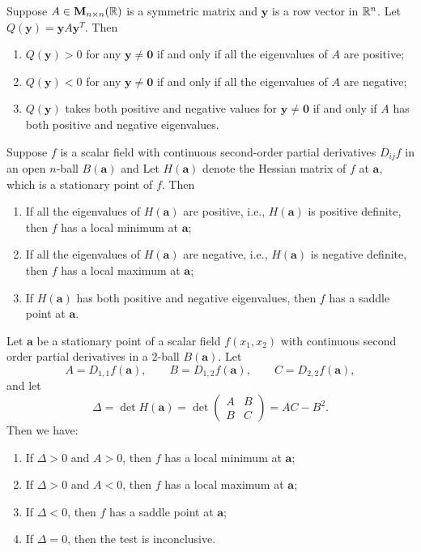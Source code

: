    \begin{lemmaenv}
        Suppose $A\in \mathbf M_{n\times n}(\mathbb{R})$ is a symmetric matrix and $\bm y $ is a row vector in $\mathbb{R}^n$. Let $Q(\bm y) = \bm y A \bm y^T$. Then
        \begin{enumerate}
            \item $Q(\bm y) > 0$ for any $\bm y \ne \bm 0$ if and only if all the eigenvalues of $A$ are positive;
            \item $Q(\bm y) < 0$ for any $\bm y \ne \bm 0$ if and only if all the eigenvalues of $A$ are negative;
            \item $Q(\bm y)$ takes both positive and negative values for $\bm y \ne \bm 0$ if and only if $A$ has both positive and negative eigenvalues.
        \end{enumerate}
    \end{lemmaenv}
    \begin{theoremenv}
        Suppose $f$ is a scalar field with continuous second-order partial derivatives $D_{ij} f$ in an open $n$-ball $B(\bm a)$ and Let $H(\bm a)$ denote the Hessian matrix of $f$ at $\bm a$, which is a stationary point of $f$. Then
        \begin{enumerate}
            \item If all the eigenvalues of $H(\bm a)$ are positive, i.e., $H(\bm a)$ is positive definite, then $f$ has a local minimum at $\bm a$;
            \item If all the eigenvalues of $H(\bm a)$ are negative, i.e., $H(\bm a)$ is negative definite, then $f$ has a local maximum at $\bm a$;
            \item If $H(\bm a)$ has both positive and negative eigenvalues, then $f$ has a saddle point at $\bm a$.
        \end{enumerate}
    \end{theoremenv}
    \begin{corollaryenv}
        Let \(\bm a\) be a stationary point of a scalar field \(f(x_1,x_2)\) with continuous second order partial derivatives in a 2-ball \(B(\bm a)\). Let
        \[
        A=D_{1,1}f(\bm a),\qquad B=D_{1,2}f(\bm a),\qquad C=D_{2,2}f(\bm a),
        \]
        and let
        \[
        \Delta=\det H(\bm a)
        =\det
        \begin{pmatrix}
        A & B\\
        B & C
        \end{pmatrix}
        =AC-B^2.
        \]
        Then we have:
        \begin{enumerate}[label=(\alph*)]
            \item If $\Delta > 0$ and $A > 0$, then $f$ has a local minimum at $\bm a$;
            \item If $\Delta > 0$ and $A < 0$, then $f$ has a local maximum at $\bm a$;
            \item If $\Delta < 0$, then $f$ has a saddle point at $\bm a$;
            \item If $\Delta = 0$, then the test is inconclusive.
        \end{enumerate}
    \end{corollaryenv}
